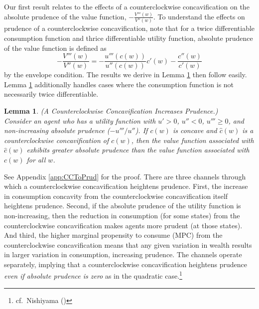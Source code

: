 \documentclass[titlepage]{\econtex}
\newtheorem{defn}{Definition}
\newtheorem{lemma}{Lemma}
\begin{document}
  Our first result relates to the effects of a counterclockwise concavification on the absolute prudence of the value function, $-\frac{V'''(w)}{V''(w)}$. 
  To understand the effects on prudence of a counterclockwise concavification, note that for a twice differentiable consumption function and thrice differentiable utility function, absolute prudence of the value function is defined as
  \begin{equation} -\frac{V'''(w)}{V''(w)} = - \frac{u'''(c(w))}{u''(c(w))}c'(w) - \frac{c''(w)}{c'(w)} \label{eq:prudence}\end{equation}
  by the envelope condition. The results we derive in Lemma \ref{lem:CCToPrud} then follow easily. Lemma \ref{lem:CCToPrud} additionally handles cases where the consumption function is not necessarily twice differentiable. 

  \begin{lemma}\label{lem:CCToPrud}  (A Counterclockwise Concavification Increases Prudence.) \\
    Consider an agent who has a utility function %
    with $u' > 0$, $u'' < 0$, $u''' \geq 0$, and non-increasing absolute prudence ($-u'''/u''$). If $c(w)$ is concave and $\hat{c}(w)$ is a counterclockwise concavification of $c(w)$, then the value function associated with $\hat{c}(w)$ exhibits greater absolute prudence than the value function associated with $c(w)$ for all $w$.
  \end{lemma}

  \noindent See Appendix \ref{app:CCToPrud} for the proof. There are three channels through which a counterclockwise concavification heightens prudence. First, the increase in consumption concavity from the counterclockwise concavification itself heightens prudence. Second, if the absolute prudence of the utility function is non-increasing, then the reduction in consumption (for some states) from the counterclockwise concavification makes agents more prudent (at those states). And third, the higher marginal propensity to consume (MPC) from the counterclockwise concavification means that any given variation in wealth results in larger variation in consumption, increasing prudence. The channels operate separately, implying that a counterclockwise concavification heightens prudence \textit{even if absolute prudence is zero} as in the quadratic case.\footnote{cf.\ Nishiyama (\citeyear{nishiyama2012concavity})}
\end{document}
